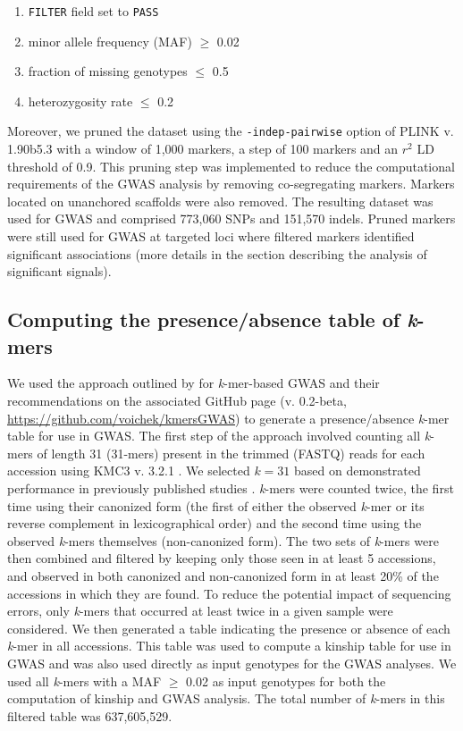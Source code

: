 \documentclass{article}
\begin{document}
\begin{enumerate}
	\item \texttt{FILTER} field set to \texttt{PASS}
	\item minor allele frequency (MAF) $\geq$ 0.02
	\item fraction of missing genotypes $\leq$ 0.5
	\item heterozygosity rate $\leq$ 0.2
\end{enumerate}

Moreover, we pruned the dataset using the \texttt{-\-indep-pairwise} option of
PLINK v. 1.90b5.3  with a window of 1,000 markers, a
step of 100 markers and an $r^2$ LD threshold of 0.9. This pruning step was
implemented to reduce the computational requirements of the GWAS analysis by
removing co-segregating markers. Markers located on unanchored scaffolds were
also removed. The resulting dataset was used for GWAS and comprised 773,060
SNPs and 151,570 indels. Pruned markers were still used for GWAS at targeted
loci where filtered markers identified significant associations (more details
in the section describing the analysis of significant signals).

\subsection*{Computing the presence/absence table of \emph{k}-mers}

We used the approach outlined by  for \emph{k}-mer-based GWAS
and their recommendations on the
associated GitHub page (v. 0.2-beta, \url{https://github.com/voichek/kmersGWAS}) to generate
a presence/absence \emph{k}-mer table for use in GWAS.  The first step of
the approach involved counting all \emph{k}-mers of length 31 (31-mers) present
in the trimmed (FASTQ) reads for each accession using KMC3 v. 3.2.1
. We selected $k = 31$ based on demonstrated performance in previously
published studies .
\emph{k}-mers were counted twice, the first time using their
canonized form (the first of either the observed \textit{k}-mer or its reverse
complement in lexicographical order) and the second time using the observed
\emph{k}-mers themselves (non-canonized form). The two sets of \textit{k}-mers
were then combined and filtered by
keeping only those seen in at least 5 accessions, and observed in both canonized
and non-canonized form in at least 20\% of the accessions in which they are found.
To reduce the potential impact of sequencing errors, only \textit{k}-mers that
occurred at least twice in a given sample were considered.
We then generated a table indicating the presence or absence of each
\emph{k}-mer in all accessions. This table was used to compute a kinship
table for use in GWAS and was also used directly as input genotypes for the
GWAS analyses. We used all \emph{k}-mers with a MAF $\geq$ 0.02 as input genotypes
for both the computation of kinship and GWAS analysis. The total number of \textit{k}-mers
in this filtered table was 637,605,529.
\end{document}
